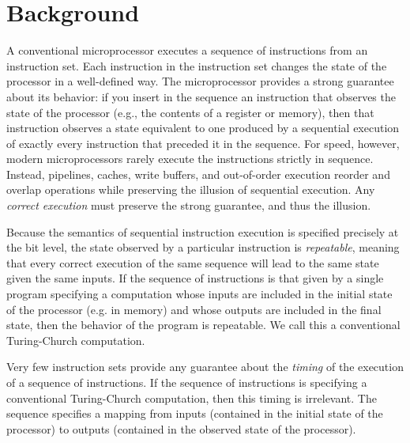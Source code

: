 \section{Background}
A conventional microprocessor executes a sequence of instructions from
an instruction set. Each instruction in the instruction set changes
the state of the processor in a well-defined way.
The microprocessor provides a strong guarantee about its
behavior: if you insert in the sequence an instruction that observes the state of the
processor (e.g., the contents of a register or memory), then that
instruction observes a state equivalent to one produced by a
sequential execution of exactly every instruction that preceded it in
the sequence.
For speed, however, modern microprocessors rarely execute the instructions
strictly in sequence. Instead, pipelines, caches, write buffers, and
out-of-order execution reorder and overlap operations while preserving
the illusion of sequential execution.  Any \emph{correct execution}
must preserve the strong guarantee, and thus the illusion.

Because the semantics of sequential instruction execution is
specified precisely at the bit level, the state observed by a
particular instruction is \emph{repeatable}, meaning that every
correct execution of the same sequence
will lead to the same state given the same inputs.
If the sequence of instructions is that given by a single program
specifying a computation whose inputs are included in
the  initial state of the processor (e.g. in memory) and whose
outputs are included in the final state, then the behavior
of the program is repeatable. We call this
a conventional Turing-Church computation.

Very few instruction sets provide any guarantee
about the \emph{timing} of the execution of a sequence of instructions.
If the sequence of instructions is specifying a conventional
Turing-Church computation, then this timing is irrelevant.
The sequence specifies a mapping from inputs (contained in the
initial state of the processor) to outputs (contained in the observed state
of the processor).

